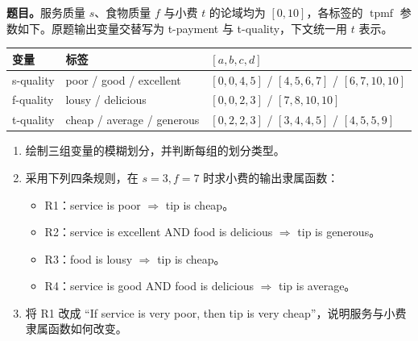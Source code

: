 \textbf{题目。}服务质量 $s$、食物质量 $f$ 与小费 $t$ 的论域均为 $[0,10]$，各标签的 $\operatorname{tpmf}$ 参数如下。原题输出变量交替写为 t-payment 与 t-quality，下文统一用 $t$ 表示。
\begin{center}
\small
\begin{tabular}{@{}lll@{}}
\toprule
变量 & 标签 & $[a,b,c,d]$ \\
\midrule
s-quality & poor / good / excellent & $[0,0,4,5]$ / $[4,5,6,7]$ / $[6,7,10,10]$ \\
f-quality & lousy / delicious & $[0,0,2,3]$ / $[7,8,10,10]$ \\
t-quality & cheap / average / generous & $[0,2,2,3]$ / $[3,4,4,5]$ / $[4,5,5,9]$ \\
\bottomrule
\end{tabular}
\end{center}
\begin{enumerate}[label=(\roman*)]
 \item 绘制三组变量的模糊划分，并判断每组的划分类型。
 \item 采用下列四条规则，在 $s=3,f=7$ 时求小费的输出隶属函数：
 \begin{itemize}
  \item R1：service is poor $\Rightarrow$ tip is cheap。
  \item R2：service is excellent AND food is delicious $\Rightarrow$ tip is generous。
  \item R3：food is lousy $\Rightarrow$ tip is cheap。
  \item R4：service is good AND food is delicious $\Rightarrow$ tip is average。
 \end{itemize}
 \item 将 R1 改成 ``If service is very poor, then tip is very cheap''，说明服务与小费隶属函数如何改变。
\end{enumerate}

